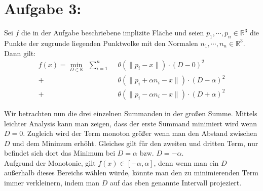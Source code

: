 \newpage
\section*{Aufgabe 3: }
Sei $f$ die in der Aufgabe beschriebene implizite Fläche und seien $p_1, \cdots, p_n \in \mathbb{R}^3$ die Punkte der zugrunde liegenden Punktwolke mit den Normalen $n_1, \cdots, n_n \in \mathbb{R}^3$.\\

Dann gilt:
\begin{align*}
  f(x) = \min_{D \in \mathbb{R}} \hspace{5pt} \sum_{i=1}^n \hspace{5pt} &\theta(\lVert p_i - x \rVert) \cdot (D - 0)^2 \\
  + &\theta(\lVert p_i + \alpha n_i - x \rVert) \cdot (D - \alpha)^2 \\
  + &\theta(\lVert p_i - \alpha n_i - x \rVert) \cdot (D + \alpha)^2
\end{align*}

Wir betrachten nun die drei einzelnen Summanden in der großen Summe. Mittels leichter Analysis kann man zeigen, dass der erste Summand minimiert wird wenn $D = 0$. Zugleich wird der Term monoton größer wenn man den Abstand zwischen $D$ und dem Minimum erhöht. Gleiches gilt für den zweiten und dritten Term, nur befindet sich dort das Minimum bei $D = \alpha$ bzw. $D = -\alpha$.\\

Aufgrund der Monotonie, gilt $f(x) \in [-\alpha, \alpha]$, denn wenn man ein $D$ außerhalb dieses Bereichs wählen würde, könnte man den zu minimierenden Term immer verkleinern, indem man $D$ auf das eben genannte Intervall projeziert.